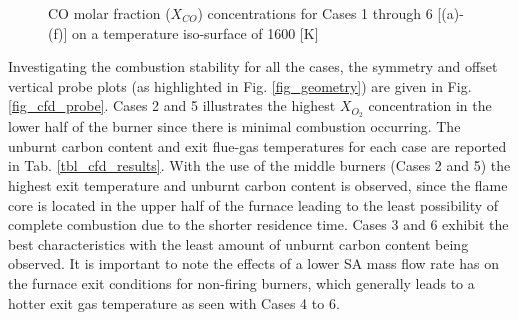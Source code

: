 \documentclass[11pt,cleanfoot]{asme2ej}
\begin{document}
\begin{figure}[h!]
\hspace{5mm}
\caption{CO molar fraction ($X_{CO}$) concentrations for 
Cases 1 through 6 [(a)-(f)] on a temperature iso-surface of 1600 [K]}
\label{fig_cfd_coppm}
\end{figure}
Investigating the combustion stability for all the cases, the symmetry and offset vertical probe plots (as highlighted in Fig. \ref{fig_geometry}) are given in Fig. \ref{fig_cfd_probe}. Cases 2 and 5 illustrates the highest $X_{O_{2}}$ concentration in the lower half of the burner since there is minimal combustion occurring. The unburnt carbon content and exit flue-gas temperatures for each case are reported in Tab. \ref{tbl_cfd_results}. With the use of the middle burners (Cases 2 and 5) the highest exit temperature and unburnt carbon content is observed, since the flame core is located in the upper half of the furnace leading to the least possibility of complete combustion due to the shorter residence time. Cases 3 and 6 exhibit the best characteristics with the least amount of unburnt carbon content being observed. It is important to note the effects of a lower SA mass flow rate has on the furnace exit conditions for non-firing burners, which generally leads to a hotter exit gas temperature as seen with Cases 4 to 6. \\
\end{document}
